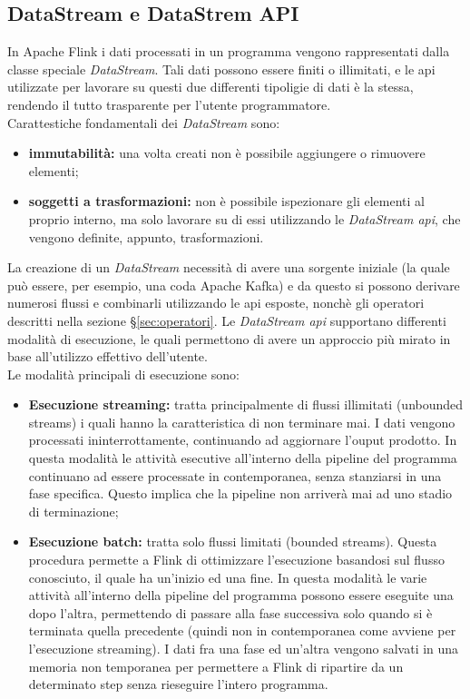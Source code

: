 \subsection{DataStream e DataStrem API}
In Apache Flink i dati processati in un programma vengono rappresentati dalla classe speciale \textit{DataStream}.
Tali dati possono essere finiti o illimitati, e le \gls{api} utilizzate per lavorare su questi due differenti tipoligie di dati è la stessa, rendendo il tutto trasparente per l'utente programmatore.\\
Carattestiche fondamentali dei \textit{DataStream} sono:
\begin{itemize}
	\item{\textbf{immutabilità:} una volta creati non è possibile aggiungere o rimuovere elementi;}
	\item{\textbf{soggetti a trasformazioni:} non è possibile ispezionare gli elementi al proprio interno, ma solo lavorare su di essi utilizzando le \textit{DataStream \gls{api}}, che vengono definite, appunto, trasformazioni.}
\end{itemize}
La creazione di un \textit{DataStream} necessità di avere una sorgente iniziale (la quale può essere, per esempio, una coda \gls{Apache Kafka}) e da questo si possono derivare numerosi flussi e combinarli utilizzando le \gls{api} esposte, nonchè gli operatori descritti nella sezione \S\ref{sec:operatori}.
Le \textit{DataStream \gls{api}} supportano differenti modalità di esecuzione, le quali permettono di avere un approccio più mirato in base all'utilizzo effettivo dell'utente.\\
Le modalità principali di esecuzione sono:
\begin{itemize}
	\item{\textbf{Esecuzione streaming:} tratta principalmente di flussi illimitati (\gls{unbounded streams}) i quali hanno la caratteristica di non terminare mai. I dati vengono processati ininterrottamente, continuando ad aggiornare l'ouput prodotto. In questa modalità le attività esecutive all'interno della \gls{pipeline} del programma continuano ad essere processate in contemporanea, senza stanziarsi in una fase specifica. Questo implica che la \gls{pipeline} non arriverà mai ad uno stadio di terminazione;}
	\item{\textbf{Esecuzione batch:} tratta solo flussi limitati (\gls{bounded streams}). Questa procedura permette a Flink di ottimizzare l'esecuzione basandosi sul flusso conosciuto, il quale ha un'inizio ed una fine. In questa modalità le varie attività all'interno della \gls{pipeline} del programma possono essere eseguite una dopo l'altra, permettendo di passare alla fase successiva solo quando si è terminata quella precedente (quindi non in contemporanea come avviene per l'esecuzione streaming). I dati fra una fase ed un'altra vengono salvati in una memoria non temporanea per permettere a Flink di ripartire da un determinato step senza rieseguire l'intero programma.}
\end{itemize}

